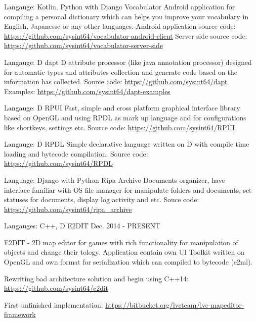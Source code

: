\begin{cventries}


\cventry
{Langauge: Kotlin, Python with Django}
{Vocabulator}
{}
{}
{
Android application for compiling a personal dictionary which can helps you improve your vocabulary in English, Japanesse or any other languages.\linebreak
Android application source code: \url{https://github.com/sysint64/vocabulator-android-client}\linebreak
Server side source code: \url{https://github.com/sysint64/vocabulator-server-side}\linebreak
}

\cventry
{Langauge: D}
{dapt}
{}
{}
{
D attribute processor (like java annotation processor) designed for automatic types and attributes collection and generate
code based on the information has collected.\linebreak
Source code: \url{https://github.com/sysint64/dapt}\linebreak
Examples: \url{https://github.com/sysint64/dapt-examples}
}

\cventry
{Langauge: D}
{RPUI}
{}
{}
{
Fast, simple and cross platform graphical interface library based on OpenGL and using RPDL as mark up language
and for configurations like shortkeys, settings etc.\linebreak
Source code: \url{https://github.com/sysint64/RPUI}
}

\cventry
{Langauge: D}
{RPDL}
{}
{}
{
Simple declarative language written on D with compile time loading and bytecode compilation.\linebreak
Source code: \url{https://github.com/sysint64/RPDL}
}

\cventry
{Language: Django with Python}
{Ripa Archive}
{}
{}
{
Documents organizer, have interface familiar with OS file manager for manipulate folders and documents, set statuses
for documents, display log activity and etc.\linebreak
Souce code: \url{https://github.com/sysint64/ripa_archive}
}

\cventry
{Langauges: C++, D} %
{E2DIT} %
{} %
{Dec. 2014 - PRESENT} %
{ %
E2DIT - 2D map editor for games with rich functionality for manipulation of objects and change their tology. \linebreak
Application contain own UI Toolkit written on OpenGL and own format for serialization which can compiled to bytecode (e2ml). \linebreak
\linebreak
\begin{cvitems}
    \item {Rewriting bad architecture solution and begin using C++14: \url{https://github.com/sysint64/e2dit}}
    \item {First unfinished implementation: \url{https://bitbucket.org/lveteam/lve-mapeditor-framework}}
\end{cvitems}
}


\end{cventries}
